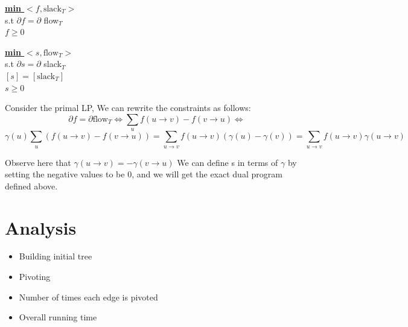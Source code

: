 \documentclass{article}
\begin{document}
\begin{minipage}[t]{0.48\linewidth}
\begin{center}
\begin{algorithm}
\textbf{\underline{min $<f, \text{slack}_{T}>$}} \\
  s.t  $\partial f =\partial $  flow$_T$ \\ \qquad
       $f \geq 0$
\end{algorithm}
\end{center}
\end{minipage}
\hfill
\begin{minipage}[t]{0.48\linewidth}
\begin{algorithm}
\textbf{\underline{min $<s, \text{flow}_{T}>$}} \\
  s.t  $\partial s = \partial $ slack$_T$ \\ \qquad
       $[s] = [\text{slack}_T]$ \\ \qquad
       $s \geq 0$
\end{algorithm}
\end{minipage}
\vspace{0.3 cm}

Consider the primal LP, We can rewrite the constraints as follows:
\[ \partial f = \partial \text{flow}_T \Longleftrightarrow \sum 
  \limits_u f(u \rightarrow v) - f(v \rightarrow u) \Longleftrightarrow \]
\[ \gamma (u)\sum_u (f(u \rightarrow v) - f(v \rightarrow u)) = 
  \sum \limits_{u \rightarrow v} f(u \rightarrow v) (\gamma (u) - \gamma (v)) = 
  \sum \limits_{u \rightarrow v} f(u \rightarrow v) \gamma (u \rightarrow v)\]

Observe here that $\gamma (u \rightarrow v) = - \gamma (v \rightarrow u)$
We can define s in terms of $\gamma $ by setting the negative values to be 0, 
and we will get the exact dual program defined above.

\section{Analysis}
\begin{itemize}
\item Building initial tree
\item Pivoting
\item Number of times each edge is pivoted
\item Overall running time
\end{itemize}
\end{document}
